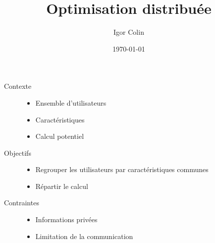 \documentclass[c]{beamer}
\title{Optimisation distribu\'ee}
\author{Igor Colin}
\date{\today}
\begin{document}
\begin{frame}
    \begin{description}
        \item[Contexte]
            \begin{itemize}
                \item Ensemble d'utilisateurs
                \item Caract\'eristiques
                \item Calcul potentiel
            \end{itemize}
        \vspace{.3cm}
        \item[Objectifs]
            \begin{itemize}
                \item Regrouper les utilisateurs par caract\'eristiques communes
                \item R\'epartir le calcul
            \end{itemize}
        \vspace{.3cm}
        \item[Contraintes]
            \begin{itemize}
                \item Informations priv\'ees
                \item Limitation de la communication
            \end{itemize}
        \vspace{.3cm}
    \end{description}
\end{frame}
\end{document}
